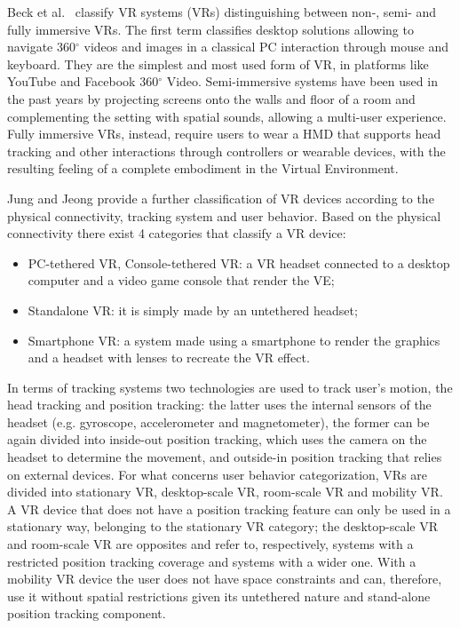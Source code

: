 Beck et al.~\cite{beck_virtual_2019} classify VR systems (VRs) distinguishing between non-, semi- and fully immersive VRs. The first term classifies desktop solutions allowing to navigate 360$^{\circ}$ videos and images in a classical PC interaction through mouse and keyboard. They are the simplest and most used form of VR, in platforms like YouTube and Facebook 360$^{\circ}$ Video. Semi-immersive systems have been used in the past years by projecting screens onto the walls and floor of a room and complementing the setting with spatial sounds, allowing a multi-user experience.
Fully immersive VRs, instead, require users to wear a \gls{HMD} that supports head tracking and other interactions through controllers or wearable devices, with the resulting feeling of a complete embodiment in the Virtual Environment.

Jung and Jeong \cite{jung_classification_2020} provide a further classification of VR devices according to the physical connectivity, tracking system and user behavior. Based on the physical connectivity there exist 4 categories that classify a VR device:
\begin{itemize}
    \item PC-tethered VR, Console-tethered VR: a VR headset connected to a desktop computer and a video game console that render the VE;
    \item Standalone VR: it is simply made by an untethered headset;
    \item Smartphone VR: a system made using a smartphone to render the graphics and a headset with lenses to recreate the VR effect.
\end{itemize}


In terms of tracking systems two technologies are used to track user's motion, the head tracking and position tracking: the latter uses the internal sensors of the headset (e.g. gyroscope, accelerometer and magnetometer), the former can be again divided into inside-out position tracking, which uses the camera on the headset to determine the movement, and outside-in position tracking that relies on external devices.
For what concerns user behavior categorization, VRs are divided into stationary VR, desktop-scale VR, room-scale VR and mobility VR. A VR device that does not have a position tracking feature can only be used in a stationary way, belonging to the stationary VR category; the desktop-scale VR and room-scale VR are opposites and refer to, respectively, systems with a restricted position tracking coverage and systems with a wider one. With a mobility VR device the user does not have space constraints and can, therefore, use it without spatial restrictions given its untethered nature and stand-alone position tracking component.